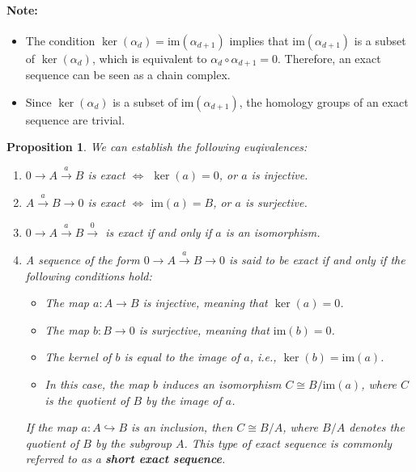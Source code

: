 \documentclass{amsart}
\newtheorem{proposition}[definition]{Proposition}
\begin{document}
\paragraph{Note:}
\begin{itemize}
	\item The condition $\ker(\alpha_d) = \text{im}(\alpha_{d+1})$ implies that $\text{im}(\alpha_{d+1})$ is a subset of $\ker(\alpha_d)$, which is equivalent to $\alpha_d \circ \alpha_{d+1} = 0$. Therefore, an exact sequence can be seen as a chain complex.
	\item Since $\ker(\alpha_d)$ is a subset of $\text{im}(\alpha_{d+1})$, the homology groups of an exact sequence are trivial.
\end{itemize}

\begin{proposition}
We can establish the following euqivalences:
\begin{enumerate}
	\item $0 \xrightarrow{} A \xrightarrow{a} B$ is exact $\Longleftrightarrow$ $\ker(a) = 0$, or $a$ is injective.
	\item $A \xrightarrow{a} B \rightarrow 0$ is exact $\Longleftrightarrow$ $\text{im}(a) = B$, or $a$ is surjective.
	\item $0 \xrightarrow{} A \xrightarrow{a} B \xrightarrow 0$ is exact if and only if $a$ is an isomorphism.
	\item A sequence of the form $0 \xrightarrow{} A \xrightarrow{a} B \xrightarrow{} 0$ is said to be exact if and only if the following conditions hold:
	\begin{itemize}
		\item The map $a: A \rightarrow B$ is injective, meaning that $\ker(a) = 0$.
		\item The map $b: B \rightarrow 0$ is surjective, meaning that $\text{im}(b) = 0$.
		\item The kernel of $b$ is equal to the image of $a$, i.e., $\ker(b) = \text{im}(a)$.
		\item In this case, the map $b$ induces an isomorphism $C \cong B/\text{im}(a)$, where $C$ is the quotient of $B$ by the image of $a$.
	\end{itemize}
	If the map $a: A \hookrightarrow B$ is an inclusion, then $C \cong B/A$, where $B/A$ denotes the quotient of $B$ by the subgroup $A$. This type of exact sequence is commonly referred to as a \textbf{short exact sequence}.
\end{enumerate}
\end{proposition}
\end{document}
